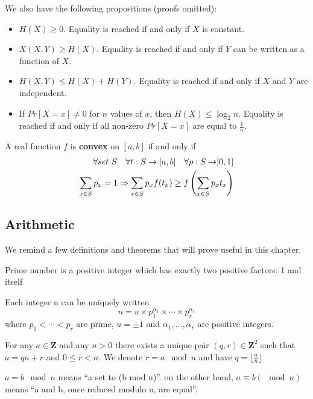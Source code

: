 \documentclass[11pt,a4paper]{article}
\newcommand{\bz}{\ensuremath{\mathbf{Z}}}
\begin{document}
 We also have the following propositions (proofs omitted):
 \begin{itemize}
     \item $H(X) \geq 0$. Equality is reached if and only if $X$ is constant.
     \item $X(X,Y) \geq H(X)$. Equality is reached if and only if $Y$ can be written as a function of $X$.
     \item $H(X,Y) \leq H(X) + H(Y)$. Equality is reached if and only if $X$ and $Y$ are independent.
     \item If $Pr[X=x] \neq 0$ for $n$ values of $x$, then $H(X) \leq \log_2 n$. Equality is reached if and only if all non-zero $Pr[X=x]$ are equal to $\frac{1}{n}$.
 \end{itemize}

 \begin{definition}[Convex]
     A real function $f$ is \textbf{convex} on $[a,b]$ if and only if
     \begin{eqnarray*}
        \forall set\ S\quad \forall t: S \to [a,b]\quad \forall p : S \to ]0,1]\\
        \sum\limits_{x\in S}^{} p_x = 1 \Rightarrow \sum\limits_{x\in S}^{} p_x f(t_x) \geq f\left(\sum\limits_{x\in S}^{} p_x t_x\right)
     \end{eqnarray*}
 \end{definition}

\subsection{Arithmetic}
We remind a few definitions and theorems that will prove useful in this chapter.
 \begin{definition}
    Prime number is a positive integer which has exactly two positive factors: 1 and itself
 \end{definition}
\begin{theorem}
    Each integer n can be uniquely written
    \[n = u \times p_1^{\alpha_1} \times \cdots \times p_r^{\alpha_r}\]
    where $p_1 < \cdots < p_r$ are prime, $u = \pm 1$ and $\alpha_1,\ldots,\alpha_r$ are positive integers.
\end{theorem}
\begin{theorem}
    For any $a \in \bz$ and any $n > 0$ there exists a unique pair $(q,r) \in \bz^2$ such that $a = qn + r$ and $0 \leq r < n$. We denote $r = a \mod n$ and have $q = \lfloor\frac{a}{n}\rfloor$
\end{theorem}
 $a = b \mod n$ means ``a set to (b mod n)''. on the other hand, $a \equiv b (\mod n)$ means ``a and b, once reduced modulo n, are equal''.
\end{document}
